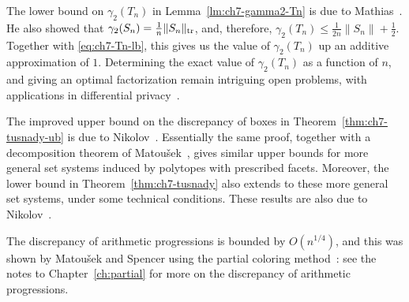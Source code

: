 The lower bound on $\gamma_2(T_n)$ in Lemma~\ref{lm:ch7-gamma2-Tn} is due to Mathias~\cite{Mathias}. He also showed that $\gamma_2(S_n) = \frac{1}{n} \|S_n\|_{\operatorname{tr}}$, and, therefore, $\gamma_2(T_n) \le \frac{1}{2n}\|S_n\| + \frac12$. Together with \eqref{eq:ch7-Tn-lb}, this gives us the value of $\gamma_2(T_n)$ up an additive approximation of $1$. Determining the exact value of $\gamma_2(T_n)$ as a function of $n$, and giving an optimal factorization remain intriguing open problems, with applications in differential privacy~\cite{DP-FTRL}.

The improved upper bound on the discrepancy of boxes in
Theorem~\ref{thm:ch7-tusnady-ub} is due to
Nikolov~\cite{tusnady-ub}. Essentially the same proof, together with a
decomposition theorem of Matou\v{s}ek~\cite{Matousek99-boxes}, gives similar upper bounds for
more general set systems induced by polytopes with prescribed facets. 
Moreover, the lower bound in Theorem~\ref{thm:ch7-tusnady}  also
extends to these more general set systems, under some technical conditions. These
results are also due to Nikolov~\cite{tusnady-ub}. 

The discrepancy of arithmetic progressions is bounded by $O(n^{1/4})$,
and this was shown by Matou\v{s}ek and Spencer using the partial
coloring method~\cite{MatousekSpencer-ap}: see the notes to
Chapter~\ref{ch:partial} for more on the discrepancy of arithmetic
progressions. 




